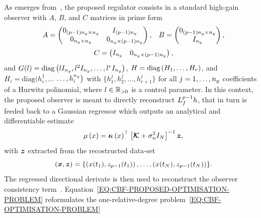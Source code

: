 As emerges from~, the proposed regulator consists in a standard high-gain observer
with $A$, $B$, and $C$ matrices in prime form
\begin{equation*}
    \begin{matrix}
        A =
        \begin{pmatrix}
            0_{(p-1)n_{y} \times n_{y}} & I_{(p-1)n_{y}} \\
            0_{n_{y} \times n_{y}} & 0_{n_{y} \times (p-1)n_{y}}
        \end{pmatrix}, &
        B =
        \begin{pmatrix}
            0_{(p-1)n_{y} \times n_{y}} \\
            I_{n_{y}}
        \end{pmatrix},
    \end{matrix}
    \end{equation*}
    \begin{equation*}
    C =
    \begin{pmatrix}
        I_{n_{y}} & 0_{n_{y} \times (p-1)n_{y}}
    \end{pmatrix},
\end{equation*}
and $G(l) = \text{diag} \left( l I_{n_{y}}, l^{2} I_{n_{y}}, \dots, l^{r} I_{n_{y}} \right)$,
$H = \text{diag} \left( H_1, \dots, H_r \right)$, and $H_i = \text{diag} \big( h^1_i, \dots$ $\dots, h^{n_{y}}_i \big)$ with
$\{h_{1}^j, h_{2}^j, \dots, h_{r+1}^j\}$ for all $j = 1, \dots, n_{y}$ coefficients of a Hurwitz polinomial,
where $l \in \mathbb{R}_{>0}$ is a control parameter.
In this context, the proposed observer is meant to directly reconstruct $L_{f}^{p-1} h$, that in turn is
feeded back to a Gaussian regressor which outputs an analytical and differentiable estimate
\begin{equation*}
	\mu \left( x \right) = \boldsymbol{\kappa} \left( x \right)^{\top} \left[ \boldsymbol{\mathcal{K}} + \sigma_n^2 I_N \right]^{-1} \boldsymbol{z},
\end{equation*}
with $\boldsymbol{z}$ extracted from the recostructed data-set
\begin{equation*}
    \left( \boldsymbol{x}, \boldsymbol{z} \right) = \{ \left( x(t_1), z_{p-1}(t_1) \right), \dots, \left( x(t_{N}), z_{p-1}(t_{N}) \right) \}.
\end{equation*}
The regressed directional derivate is then used to reconstruct the observer consistency term~\cite{buisson2021joint}.
Equation~\eqref{EQ:CBF-PROPOSED-OPTIMISATION-PROBLEM} reformulates the one-relative-degree problem~\eqref{EQ:CBF-OPTIMISATION-PROBLEM}
